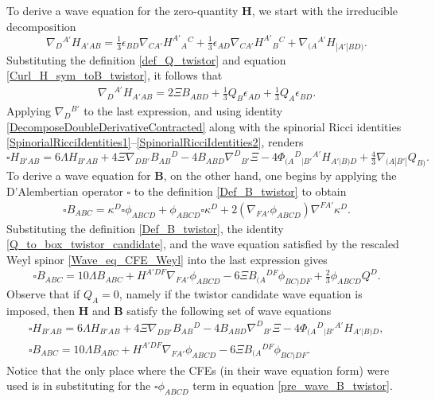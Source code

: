 \documentclass[10pt,a4paper]{article}
\theoremstyle{plain}
\def\bmB{{\bm B}}
\def\bmH{{\bm H}}
\begin{document}
To derive a wave equation for the zero-quantity $\bmH$, we start with the irreducible decomposition
\[
\nabla_{D}{}^{A'}H_{A'AB} = \tfrac{1}{3} \epsilon _{BD}
\nabla_{CA'}H^{A'}{}_{A}{}^{C} + \tfrac{1}{3} \epsilon _{AD}
\nabla_{CA'}H^{A'}{}_{B}{}^{C} + \nabla_{(A}{}^{A'}H_{|A'|BD)}.
\]
Substituting the definition \eqref{def_Q_twistor} and equation
\eqref{Curl_H_sym_toB_twistor}, it follows that
\begin{align}\label{derH_twistor_toBandQ}
\nabla_{D}{}^{A'}H_{A'AB} = 2 \Xi B_{ABD}  + \tfrac{1}{3} Q_{B}
\epsilon _{AD} + \tfrac{1}{3} Q_{A} \epsilon _{BD}.
\end{align}
Applying $\nabla_{D}{}^{B'}$ to the last expression, and using
identity \eqref{DecomposeDoubleDerivativeContracted} along with the
spinorial Ricci identities
\eqref{SpinorialRicciIdentities1}--\eqref{SpinorialRicciIdentities2},
renders
\begin{equation}\label{wave_H_twistor}
  \square H_{B'AB} = 6 \Lambda H_{B'AB} + 4 \Xi
  \nabla_{DB'}B_{AB}{}^{D} -4 B_{ABD} \nabla^{D}{}_{B'}\Xi -4
  \Phi_{(A}{}^{D}{}_{|B'}{}^{A'}H_{A'|B)D} + \tfrac{4}{3}
  \nabla_{(A|B'|}Q_{B)}.
\end{equation}
To derive a wave equation for $\bmB$, on the other hand, one begins by applying the D'Alembertian
operator $\square$ to the definition \eqref{Def_B_twistor} to obtain
\begin{align}\label{pre_wave_B_twistor}
\square B_{ABC} = \kappa ^{D} \square \phi _{ABCD} + \phi _{ABCD}
\square \kappa ^{D} + 2 (\nabla_{FA'}\phi _{ABCD}) \nabla^{FA'}\kappa
^{D}.
\end{align}
Substituting the definition \eqref{Def_B_twistor}, the identity
\eqref{Q_to_box_twistor_candidate}, and the wave equation satisfied by
the rescaled Weyl spinor \eqref{Wave_eq_CFE_Weyl} into the last
expression gives
\begin{equation}\label{wave_B_twistor}
\square B_{ABC} = 10 \Lambda B_{ABC} + H^{A'DF} \nabla_{FA'}\phi
_{ABCD} -6 \Xi B_{(A}{}^{DF}\phi _{BC)DF} + \tfrac{2}{3} \phi _{ABCD}
Q^{D}.
\end{equation}
Observe that if $Q_{A}=0$, namely if the twistor candidate wave
equation is imposed, then $\bmH$ and $\bmB$ satisfy the following set
of wave equations
\begin{subequations}
\begin{eqnarray}
  && \square H_{B'AB} = 6 \Lambda H_{B'AB} + 4 \Xi
  \nabla_{DB'}B_{AB}{}^{D}  -4 B_{ABD} \nabla^{D}{}_{B'}\Xi   -4 \Phi_{(A}{}^{D}{}_{|B'}{}^{A'}H_{A'|B)D},\qquad
   \label{Hom_wave_HandB1} \\
 && \square B_{ABC} = 10\Lambda B_{ABC} + H^{A'DF} \nabla_{FA'}\phi _{ABCD}  -6 \Xi B_{(A}{}^{DF}\phi
_{BC)DF}.  \label{Hom_wave_HandB2}
\end{eqnarray}
\end{subequations}
Notice that the only place where the CFEs (in their wave equation
form) were used is in substituting for the $\square \phi _{ABCD}$ term
in equation \eqref{pre_wave_B_twistor}.  
\end{document}
